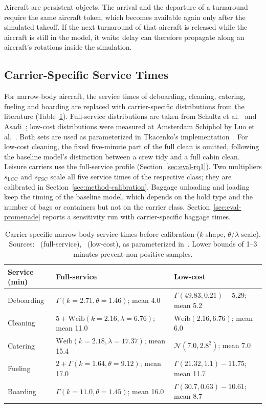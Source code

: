 Aircraft are persistent objects. The arrival and the departure of a turnaround require the same aircraft token, which becomes available again only after the simulated takeoff. If the next turnaround of that aircraft is released while the aircraft is still in the model, it waits; delay can therefore propagate along an aircraft's rotations inside the simulation.

\subsection{Carrier-Specific Service Times}
For narrow-body aircraft, the service times of deboarding, cleaning, catering, fueling and boarding are replaced with carrier-specific distributions from the literature (Table~\ref{tab:servicetimes}). Full-service distributions are taken from Schultz et al.~\cite{schultz2012dynamic} and Asadi~\cite{asadi2024robust}; low-cost distributions were measured at Amsterdam Schiphol by Luo et al.~\cite{luo2024digitaltwin}. Both sets are used as parameterized in Tkacenko's implementation~\cite{tkacenko2026}. For low-cost cleaning, the fixed five-minute part of the full clean is omitted, following the baseline model's distinction between a crew tidy and a full cabin clean. Leisure carriers use the full-service profile (Section~\ref{sec:eval-rq1}). Two multipliers $s_{\mathrm{LCC}}$ and $s_{\mathrm{FSC}}$ scale all five service times of the respective class; they are calibrated in Section~\ref{sec:method-calibration}. Baggage unloading and loading keep the timing of the baseline model, which depends on the hold type and the number of bags or containers but not on the carrier class. Section~\ref{sec:eval-promenade} reports a sensitivity run with carrier-specific baggage times.

\begin{table}[htbp]\centering\footnotesize
\begin{tabular}{lp{3.6cm}p{3.6cm}}\hline
Service (min) & Full-service & Low-cost\\\hline
Deboarding & $\Gamma(k{=}2.71,\theta{=}1.46)$; mean 4.0 & $\Gamma(49.83,0.21)-5.29$; mean 5.2\\
Cleaning & $5+\mathrm{Weib}(k{=}2.16,\lambda{=}6.76)$; mean 11.0 & $\mathrm{Weib}(2.16,6.76)$; mean 6.0\\
Catering & $\mathrm{Weib}(k{=}2.18,\lambda{=}17.37)$; mean 15.4 & $\mathcal{N}(7.0,2.8^2)$; mean 7.0\\
Fueling & $2+\Gamma(k{=}1.64,\theta{=}9.12)$; mean 17.0 & $\Gamma(21.32,1.1)-11.75$; mean 11.7\\
Boarding & $\Gamma(k{=}11.0,\theta{=}1.45)$; mean 16.0 & $\Gamma(30.7,0.63)-10.61$; mean 8.7\\\hline
\end{tabular}
\caption{Carrier-specific narrow-body service times before calibration ($k$ shape, $\theta$/$\lambda$ scale). Sources:~\cite{schultz2012dynamic,asadi2024robust} (full-service),~\cite{luo2024digitaltwin} (low-cost), as parameterized in~\cite{tkacenko2026}. Lower bounds of 1--3 minutes prevent non-positive samples.}
\label{tab:servicetimes}
\end{table}


